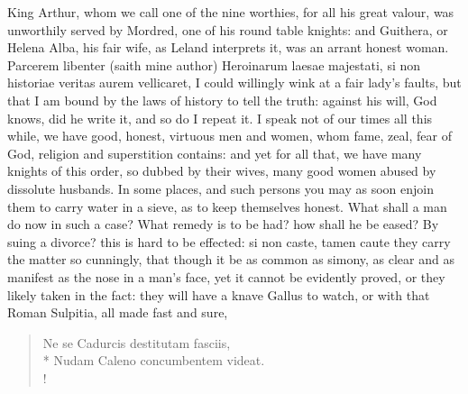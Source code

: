 King Arthur, whom we call one of the nine worthies, for all his
great valour, was unworthily served by Mordred, one of his round table
knights: and Guithera, or Helena Alba, his fair wife, as Leland
interprets it, was an arrant honest woman. Parcerem libenter (saith
mine author) Heroinarum laesae majestati, si non historiae
veritas aurem vellicaret, I could willingly wink at a fair lady's
faults, but that I am bound by the laws of history to tell the truth:
against his will, God knows, did he write it, and so do I repeat it. I
speak not of our times all this while, we have good, honest, virtuous
men and women, whom fame, zeal, fear of God, religion and superstition
contains: and yet for all that, we have many knights of this order, so
dubbed by their wives, many good women abused by dissolute husbands. In
some places, and such persons you may as soon enjoin them to carry
water in a sieve, as to keep themselves honest. What shall a man do now
in such a case? What remedy is to be had? how shall he be eased? By
suing a divorce? this is hard to be effected: si non caste, tamen caute
they carry the matter so cunningly, that though it be as common as
simony, as clear and as manifest as the nose in a man's face, yet it
cannot be evidently proved, or they likely taken in the fact: they will
have a knave Gallus to watch, or with that Roman Sulpitia, all
made fast and sure,
%
\begin{latin}%
\begin{verse}%
Ne se Cadurcis destitutam fasciis,\\*
Nudam Caleno concumbentem videat.\\!
\end{verse}%
\end{latin}%

